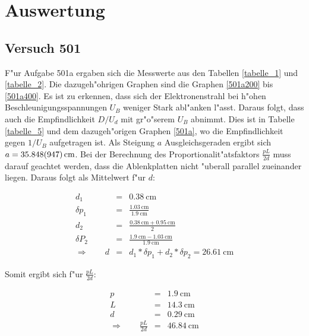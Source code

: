 \section{Auswertung}
\label{sec:auswertung}

	\subsection{Versuch 501} %
	\label{sub:versuch_501}
	
		
		F"ur Aufgabe 501a ergaben sich die Messwerte aus den Tabellen \ref{tabelle_1} und \ref{tabelle_2}. Die dazugeh"ohrigen Graphen sind die Graphen \ref{501a200} bis \ref{501a400}.
		Es ist zu erkennen, dass sich der Elektronenstrahl bei h"ohen Beschleunigungsspannungen $U_B$ weniger Stark abl"anken l"asst. Daraus folgt, dass auch die Empfindlichkeit $D/U_d$ mit gr"o"serem $U_B$ abnimmt. Dies ist in Tabelle \ref{tabelle_5} und dem dazugeh"origen Graphen \ref{501a}, wo die Empfindlichkeit gegen $1/U_B$ aufgetragen ist.
		Als Steigung $a$ Ausgleichsgeraden ergibt sich $a = \SI{35.848 (947)}{\centi\meter}$.
		Bei der Berechnung des Proportionalit"atsfaktors $\frac{pL}{2d}$ muss darauf geachtet werden, dass die Ablenkplatten nicht "uberall parallel zueinander liegen. Daraus folgt als Mittelwert f"ur $d$:

		\begin{eqnarray*}
			d_1 &=& \SI{0.38}{\centi \meter}\\
			\delta p_1 &=& \frac{\SI{1.03}{\centi \meter}}{\SI{1.9}{\centi \meter}}\\
			d_2 &=& \frac{\SI{0.38}{\centi \meter}+\SI{0.95}{\centi\meter}}{2}\\
			\delta P_2 &=& \frac{\SI{1.9}{\centi \meter}-\SI{1.03}{\centi\meter}}{\SI{1.9}{\centi\meter}}\\
			\Rightarrow \qquad d &=& d_1 * \delta p_1 + d_2 * \delta p_2 = \SI{26.61}{\centi\meter}
		\end{eqnarray*} 

		Somit ergibt sich f"ur $\frac{pL}{2d}$:

		\begin{eqnarray*}
			p &=& \SI{1.9}{\centi \meter}\\
			L &=& \SI{14.3}{\centi \meter}\\
			d &=& \SI{0.29}{\centi \meter}\\
			\Rightarrow \qquad \frac{pL}{2d} &=& \SI{46.84}{\centi\meter}
		\end{eqnarray*}

